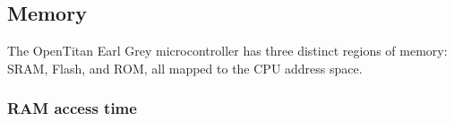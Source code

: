 \documentclass{article}
\begin{document}

\subsection{Memory}

The OpenTitan Earl Grey microcontroller has three distinct regions of memory: SRAM, Flash, and ROM, all mapped to the CPU address space.

\subsubsection{RAM access time}

\end{document}

